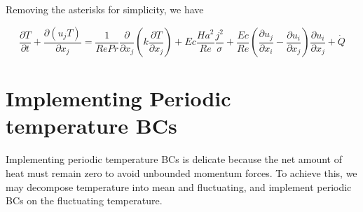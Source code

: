 \documentclass[11pt]{article}
\newcommand{\PD}{\partial}
\begin{document}
Removing the asterisks for simplicity, we have

\begin{equation}
	\frac{\PD T}{\PD t} +
	\frac{\PD (u_j T)}{\PD x_j}
	= 
	\frac{1}{Re Pr}
	\frac{\PD}{\PD x_j}
	\left( k \frac{\PD T}{\PD x_j} \right) + 
	Ec \frac{Ha^2}{Re}
	\frac{{j}^2}{\sigma} +
	\frac{Ec}{Re}
	\left( \frac{\PD u_j}{\PD x_i} - \frac{\PD u_i}{\PD x_j} \right)
	\frac{\PD u_i}{\PD x_j} +
	\dot{Q}
\end{equation}

\section{Implementing Periodic temperature BCs}
Implementing periodic temperature BCs is delicate because the net amount of heat must remain zero to avoid unbounded momentum forces. To achieve this, we may decompose temperature into mean and fluctuating, and implement periodic BCs on the fluctuating temperature.
\end{document}

